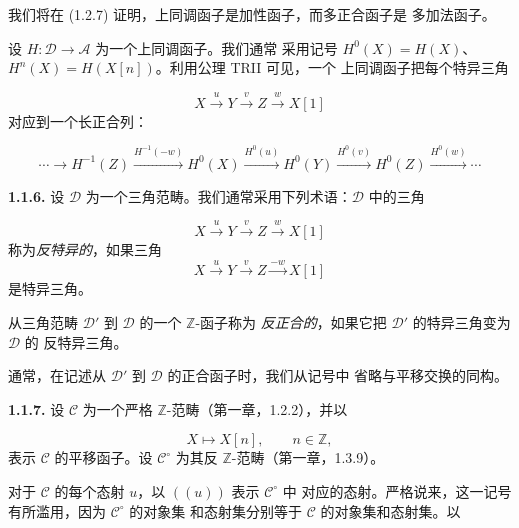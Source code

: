 \clearpage
{}%
\begingroup
\small
\setlength{\abovedisplayskip}{4pt plus 2pt minus 2pt}%
\setlength{\belowdisplayskip}{4pt plus 2pt minus 2pt}%

\noindent 我们将在 (1.2.7) 证明，上同调函子是加性函子，而多正合函子是
多加法函子。

设 $H\colon\mathcal D\longrightarrow\mathcal A$ 为一个上同调函子。我们通常
采用记号 $H^0(X)=H(X)$、$H^n(X)=H(X[n])$。利用公理 TRII 可见，一个
上同调函子把每个特异三角

\[
  X\xrightarrow{u}Y\xrightarrow{v}Z\xrightarrow{w}X[1]
\]
对应到一个长正合列：

\begin{equation}
  \cdots\longrightarrow H^{-1}(Z)
  \xrightarrow{H^{-1}(-w)}H^0(X)
  \xrightarrow{H^0(u)}H^0(Y)
  \xrightarrow{H^0(v)}H^0(Z)
  \xrightarrow{H^0(w)}\cdots
  \tag{1.1.5.1}
\end{equation}

\medskip
\noindent\textbf{1.1.6.}\quad
设 $\mathcal D$ 为一个三角范畴。我们通常采用下列术语：$\mathcal D$ 中的三角

\[
  X\xrightarrow{u}Y\xrightarrow{v}Z\xrightarrow{w}X[1]
\]
称为\emph{反特异的}，如果三角
\[
  X\xrightarrow{u}Y\xrightarrow{v}Z\xrightarrow{-w}X[1]
\]
是特异三角。

从三角范畴 $\mathcal D'$ 到 $\mathcal D$ 的一个 $\mathbb Z$-函子称为
\emph{反正合的}，如果它把 $\mathcal D'$ 的特异三角变为 $\mathcal D$ 的
反特异三角。

通常，在记述从 $\mathcal D'$ 到 $\mathcal D$ 的正合函子时，我们从记号中
省略与平移交换的同构。

\medskip
\noindent\textbf{1.1.7.}\quad
设 $\mathcal C$ 为一个严格 $\mathbb Z$-范畴（第一章，1.2.2），并以

\[
  X\longmapsto X[n],\qquad n\in\mathbb Z,
\]
表示 $\mathcal C$ 的平移函子。设 $\mathcal C^\circ$ 为其反
$\mathbb Z$-范畴（第一章，1.3.9）。

对于 $\mathcal C$ 的每个态射 $u$，以 $((u))$ 表示 $\mathcal C^\circ$ 中
对应的态射。严格说来，这一记号有所滥用，因为 $\mathcal C^\circ$ 的对象集
和态射集分别等于 $\mathcal C$ 的对象集和态射集。以

